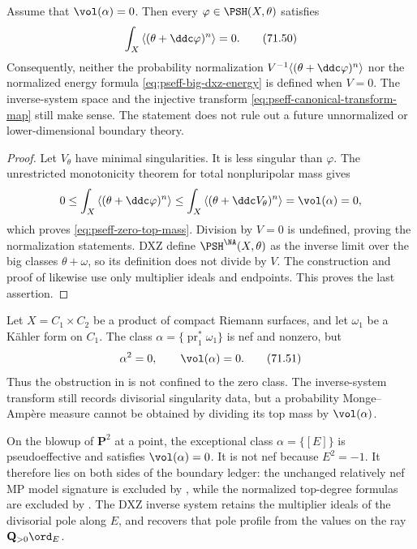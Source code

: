 \begin{proposition}\label{prop:pseff-zero-volume-boundary}
Assume that \(\vol(\alpha)=0\).  Then every
\(\varphi\in\PSH(X,\theta)\) satisfies
\[
 \int_X\left\langle
       (\theta+\ddc\varphi)^n
 \right\rangle=0.
\tag{71.50}\label{eq:pseff-zero-top-mass}
\]
Consequently, neither the probability normalization
\(V^{-1}\langle(\theta+\ddc\varphi)^n\rangle\) nor the normalized energy
formula \eqref{eq:pseff-big-dxz-energy} is defined when \(V=0\).
The inverse-system space and the injective transform
\eqref{eq:pseff-canonical-transform-map} still make sense.  The statement
does not rule out a future unnormalized or lower-dimensional boundary
theory.
\end{proposition}

\begin{proof}
Let \(V_\theta\) have minimal singularities.  It is less singular than
\(\varphi\).  The unrestricted monotonicity theorem for total
nonpluripolar mass \cite[Theorem~1.1]{DDNL18mono} gives
\[
 0\leq\int_X\left\langle
       (\theta+\ddc\varphi)^n
      \right\rangle
 \leq\int_X\left\langle
       (\theta+\ddc V_\theta)^n
      \right\rangle
 =\vol(\alpha)=0,
\]
which proves \eqref{eq:pseff-zero-top-mass}.  Division by \(V=0\) is
undefined, proving the normalization statements.  DXZ define
\(\PSH^{\NA}(X,\theta)\) as the inverse limit over the big classes
\(\theta+\omega\), so its definition does not divide by \(V\).
The construction and proof of
 likewise use only
multiplier ideals and endpoints.  This proves the last assertion.
\end{proof}

\begin{example}
Let \(X=C_1\times C_2\) be a product of compact Riemann surfaces, and let
\(\omega_1\) be a K\"ahler form on \(C_1\).  The class
\(\alpha=\{\operatorname{pr}_1^*\omega_1\}\) is nef and nonzero, but
\[
                 \alpha^2=0,
                 \qquad \vol(\alpha)=0.
\tag{71.51}\label{eq:pseff-product-zero-volume}
\]
Thus the obstruction in
 is not confined to the zero class.
The inverse-system transform still records divisorial singularity data,
but a probability Monge--Amp\`ere measure cannot be obtained by dividing
its top mass by \(\vol(\alpha)\).
\end{example}

\begin{example}
On the blowup of \(\mathbf P^2\) at a point, the exceptional class
\(\alpha=\{[E]\}\) is pseudoeffective and satisfies
\(\vol(\alpha)=0\).  It is not nef because \(E^2=-1\).  It therefore lies
on both sides of the boundary ledger: the unchanged relatively nef MP
model signature is excluded by
, while the normalized
top-degree formulas are excluded by
.  The DXZ inverse system retains
the multiplier ideals of the divisorial pole along \(E\), and
 recovers that pole profile from the
values on the ray \(\mathbf Q_{>0}\ord_E\).
\end{example}

